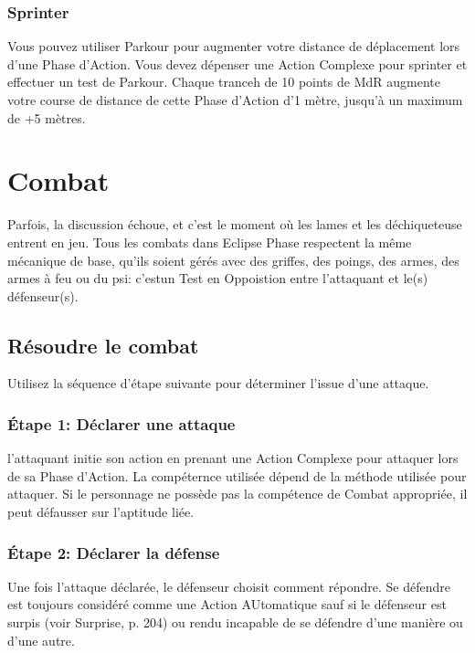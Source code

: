 \subsubsection{Sprinter} 

Vous pouvez utiliser Parkour pour augmenter votre distance de déplacement lors d'une Phase d'Action. Vous devez dépenser une Action Complexe pour sprinter et effectuer un test de Parkour. Chaque tranceh de 10 points de MdR augmente votre course de distance de cette Phase d'Action d'1 mètre, jusqu'à un maximum de +5 mètres. 



\section{Combat} \label{sec:combat} 

Parfois, la discussion échoue, et c'est le moment où les lames et les déchiqueteuse entrent en jeu. Tous les combats dans Eclipse Phase respectent la même mécanique de base, qu'ils soient gérés avec des griffes, des poings, des armes, des armes à feu ou du psi: c'estun Test en Oppoistion entre l'attaquant et le(s) défenseur(s). 

\subsection{Résoudre le combat} 

Utilisez la séquence d'étape suivante pour déterminer l'issue d'une attaque. 

\subsubsection{Étape 1: Déclarer une attaque} 

l'attaquant initie son action en prenant une Action Complexe pour attaquer lors de sa Phase d'Action. La compéternce utilisée dépend de la méthode utilisée pour attaquer. Si le personnage ne possède pas la compétence de Combat appropriée, il peut défausser sur l'aptitude liée. 

\subsubsection{Étape 2: Déclarer la défense} 

Une fois l'attaque déclarée, le défenseur choisit comment répondre. Se défendre est toujours considéré comme une Action AUtomatique sauf si le défenseur est surpis (voir Surprise, p. 204) ou rendu incapable de se défendre d'une manière ou d'une autre. 

